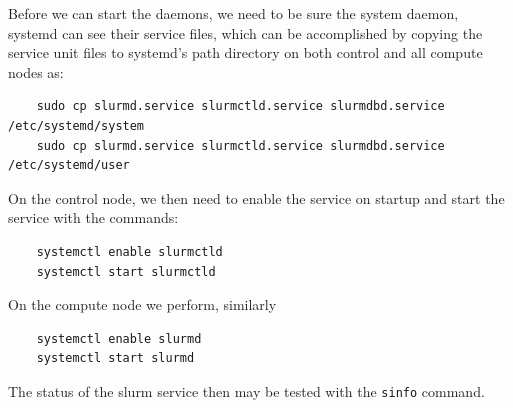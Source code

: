 \documentclass[]{article}
\begin{document}
Before we can start the daemons, we need to be sure the system daemon, systemd can see their service files, which can be accomplished by copying the service unit files to systemd's path directory on both control and all compute nodes as:
\begin{verbatim}
	sudo cp slurmd.service slurmctld.service slurmdbd.service /etc/systemd/system
	sudo cp slurmd.service slurmctld.service slurmdbd.service /etc/systemd/user
\end{verbatim}
 On the control node, we then need to enable the service on startup and start the service with the commands:
\begin{verbatim}
	systemctl enable slurmctld
	systemctl start slurmctld
\end{verbatim}
 On the compute node we perform, similarly
\begin{verbatim}
	systemctl enable slurmd
	systemctl start slurmd
\end{verbatim}
The status of the slurm service then may be tested with the \verb|sinfo| command.
\end{document}
